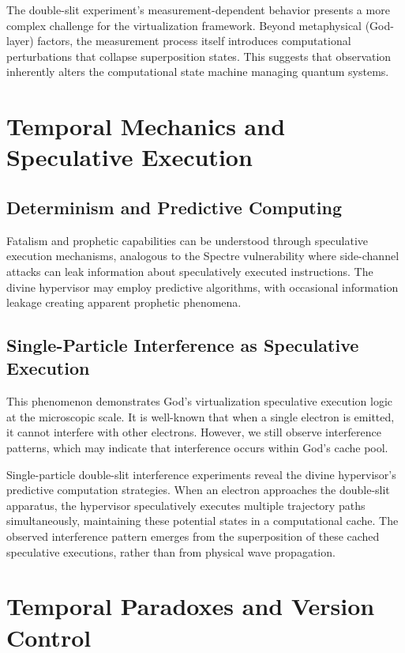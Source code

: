 \documentclass[12pt,a4paper]{article}
\begin{document}
The double-slit experiment's measurement-dependent behavior presents a more complex challenge for the virtualization framework. Beyond metaphysical (God-layer) factors, the measurement process itself introduces computational perturbations that collapse superposition states. This suggests that observation inherently alters the computational state machine managing quantum systems.

\section{Temporal Mechanics and Speculative Execution}

\subsection{Determinism and Predictive Computing}

Fatalism and prophetic capabilities can be understood through speculative execution mechanisms, analogous to the Spectre vulnerability \cite{spectre_cve} where side-channel attacks can leak information about speculatively executed instructions. The divine hypervisor may employ predictive algorithms, with occasional information leakage creating apparent prophetic phenomena.

\subsection{Single-Particle Interference as Speculative Execution}

This phenomenon demonstrates God's virtualization speculative execution logic at the microscopic scale. It is well-known that when a single electron is emitted, it cannot interfere with other electrons. However, we still observe interference patterns, which may indicate that interference occurs within God's cache pool.

Single-particle double-slit interference experiments reveal the divine hypervisor's predictive computation strategies. When an electron approaches the double-slit apparatus, the hypervisor speculatively executes multiple trajectory paths simultaneously, maintaining these potential states in a computational cache. The observed interference pattern emerges from the superposition of these cached speculative executions, rather than from physical wave propagation.

\section{Temporal Paradoxes and Version Control}
\end{document}
